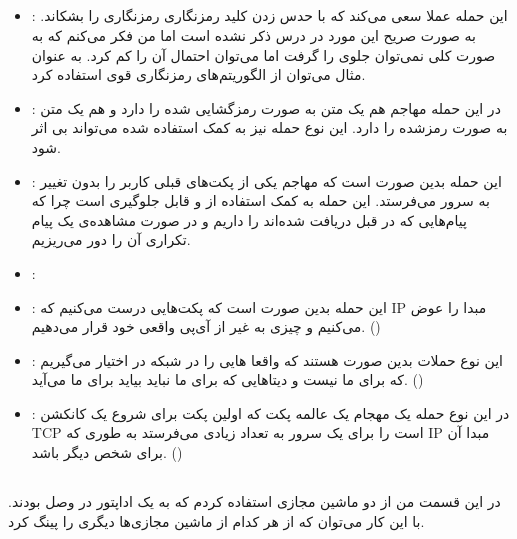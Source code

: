 \documentclass[]{article}
\begin{document}
\subsection{}
\begin{itemize}
    \item \textbf{}: این حمله عملا سعی می‌کند که با حدس زدن کلید رمزنگاری رمزنگاری را بشکاند. به صورت صریح این مورد در درس ذکر نشده است اما من فکر می‌کنم که به صورت کلی نمی‌توان جلوی  را گرفت اما می‌توان احتمال آن را کم کرد. به عنوان مثال می‌توان از الگوریتم‌های رمزنگاری قوی استفاده کرد.
    \item \textbf{}: در این حمله مهاجم هم یک متن به صورت رمزگشایی شده را دارد و هم یک متن به صورت رمزشده را دارد. این نوع حمله نیز به کمک  استفاده شده می‌تواند بی اثر شود.
    \item \textbf{}: این حمله بدین صورت است که مهاجم یکی از پکت‌های قبلی کاربر را بدون تغییر به سرور می‌فرستد. این حمله به کمک استفاده از  و  قابل جلوگیری است چرا که پیام‌هایی که در قبل دریافت شده‌اند را داریم و در صورت مشاهده‌ی یک پیام تکراری آن را دور می‌ریزیم.
    \item \textbf{}:
    \item \textbf{}: این حمله بدین صورت است که پکت‌هایی درست می‌کنیم که IP مبدا را عوض می‌کنیم و چیزی به غیر از آی‌پی واقعی خود قرار می‌دهیم. ()
    \item \textbf{}: این نوع حملات بدین صورت هستند که واقعا هایی را در شبکه در اختیار می‌گیریم که برای ما نیست و دیتا‌هایی که برای ما نباید بیاید برای ما می‌آید.  ()
    \item \textbf{}: در این نوع حمله یک مهجام یک عالمه پکت  که اولین پکت برای شروع یک کانکشن TCP است را برای یک سرور به تعداد زیادی می‌فرستد به طوری که IP مبدا آن برای شخص دیگر باشد. ()
\end{itemize}
\subsection{}
در این قسمت من از دو ماشین مجازی
استفاده کردم که به یک اداپتور
در
وصل بودند. با این کار می‌توان که از هر کدام از ماشین مجازی‌ها دیگری را پینگ کرد.
\end{document}
